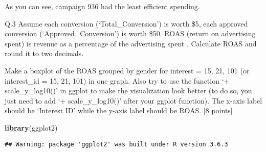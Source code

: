 \documentclass[
]{article}
\newenvironment{Shaded}{\begin{snugshade}}{\end{snugshade}}
\newcommand{\KeywordTok}[1]{\textcolor[rgb]{0.13,0.29,0.53}{\textbf{#1}}}
\newcommand{\NormalTok}[1]{#1}
\begin{document}
As you can see, campaign 936 had the least efficient spending.

Q.3 Assume each conversion (`Total\_Conversion') is worth \$5, each
approved conversion (`Approved\_Conversion') is worth \$50. ROAS (return
on advertising spent) is revenue as a percentage of the advertising
spent . Calculate ROAS and round it to two decimals.

Make a boxplot of the ROAS grouped by gender for interest = 15, 21, 101
(or interest\_id = 15, 21, 101) in one graph. Also try to use the
function `+ scale\_y\_log10()' in ggplot to make the visualization look
better (to do so, you just need to add `+ scale\_y\_log10()' after your
ggplot function). The x-axis label should be `Interest ID' while the
y-axis label should be ROAS. {[}8 points{]}

\begin{Shaded}
\begin{Highlighting}[]
\KeywordTok{library}\NormalTok{(ggplot2)}
\end{Highlighting}
\end{Shaded}

\begin{verbatim}
## Warning: package 'ggplot2' was built under R version 3.6.3
\end{verbatim}
\end{document}
